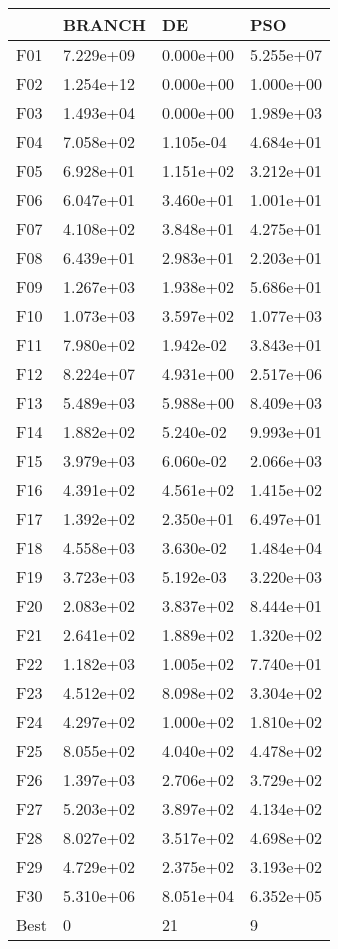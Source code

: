 \begin{tabular}{llll}
\toprule
{} &     BRANCH &         DE &        PSO \\
\midrule
F01  &  7.229e+09 &  0.000e+00 &  5.255e+07 \\
F02  &  1.254e+12 &  0.000e+00 &  1.000e+00 \\
F03  &  1.493e+04 &  0.000e+00 &  1.989e+03 \\
F04  &  7.058e+02 &  1.105e-04 &  4.684e+01 \\
F05  &  6.928e+01 &  1.151e+02 &  3.212e+01 \\
F06  &  6.047e+01 &  3.460e+01 &  1.001e+01 \\
F07  &  4.108e+02 &  3.848e+01 &  4.275e+01 \\
F08  &  6.439e+01 &  2.983e+01 &  2.203e+01 \\
F09  &  1.267e+03 &  1.938e+02 &  5.686e+01 \\
F10  &  1.073e+03 &  3.597e+02 &  1.077e+03 \\
F11  &  7.980e+02 &  1.942e-02 &  3.843e+01 \\
F12  &  8.224e+07 &  4.931e+00 &  2.517e+06 \\
F13  &  5.489e+03 &  5.988e+00 &  8.409e+03 \\
F14  &  1.882e+02 &  5.240e-02 &  9.993e+01 \\
F15  &  3.979e+03 &  6.060e-02 &  2.066e+03 \\
F16  &  4.391e+02 &  4.561e+02 &  1.415e+02 \\
F17  &  1.392e+02 &  2.350e+01 &  6.497e+01 \\
F18  &  4.558e+03 &  3.630e-02 &  1.484e+04 \\
F19  &  3.723e+03 &  5.192e-03 &  3.220e+03 \\
F20  &  2.083e+02 &  3.837e+02 &  8.444e+01 \\
F21  &  2.641e+02 &  1.889e+02 &  1.320e+02 \\
F22  &  1.182e+03 &  1.005e+02 &  7.740e+01 \\
F23  &  4.512e+02 &  8.098e+02 &  3.304e+02 \\
F24  &  4.297e+02 &  1.000e+02 &  1.810e+02 \\
F25  &  8.055e+02 &  4.040e+02 &  4.478e+02 \\
F26  &  1.397e+03 &  2.706e+02 &  3.729e+02 \\
F27  &  5.203e+02 &  3.897e+02 &  4.134e+02 \\
F28  &  8.027e+02 &  3.517e+02 &  4.698e+02 \\
F29  &  4.729e+02 &  2.375e+02 &  3.193e+02 \\
F30  &  5.310e+06 &  8.051e+04 &  6.352e+05 \\
Best &          0 &         21 &          9 \\
\bottomrule
\end{tabular}
